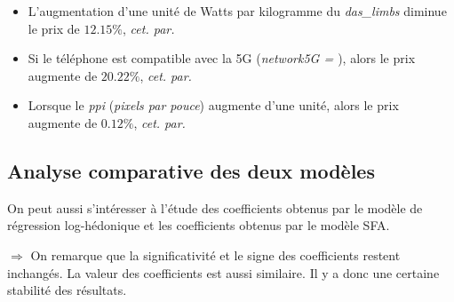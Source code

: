 \documentclass[
  12pt,
]{report}
\providecommand{\tightlist}{%
  \setlength{\itemsep}{0pt}\setlength{\parskip}{0pt}}\usepackage{longtable,booktabs,array}
\renewcommand{\texttt}[1]{\colorbox{light}{\color{highlight}{\ttfamily{#1}}}}
\begin{document}
\begin{itemize}
  \begin{itemize}
  \tightlist
  \item
    L'augmentation d'une unité de Watts par kilogramme du
    \emph{das\_limbs} diminue le prix de \(12.15\%\), \emph{cet. par.}
  \end{itemize}
\end{itemize}

\begin{itemize}
\item
  Si le téléphone est compatible avec la 5G (\emph{network5G =
  \texttt{TRUE}}), alors le prix augmente de \(20.22\%\), \emph{cet.
  par.}
\item
  Lorsque le \emph{ppi} (\emph{pixels par pouce}) augmente d'une unité,
  alors le prix augmente de \(0.12\%\), \emph{cet. par.}
\end{itemize}

\newpage

\subsection{Analyse comparative des deux
modèles}\label{analyse-comparative-des-deux-moduxe8les}

On peut aussi s'intéresser à l'étude des coefficients obtenus par le
modèle de régression log-hédonique et les coefficients obtenus par le
modèle SFA.

\(\Rightarrow\) On remarque que la significativité et le signe des
coefficients restent inchangés. La valeur des coefficients est aussi
similaire. Il y a donc une certaine stabilité des résultats.
\end{document}
